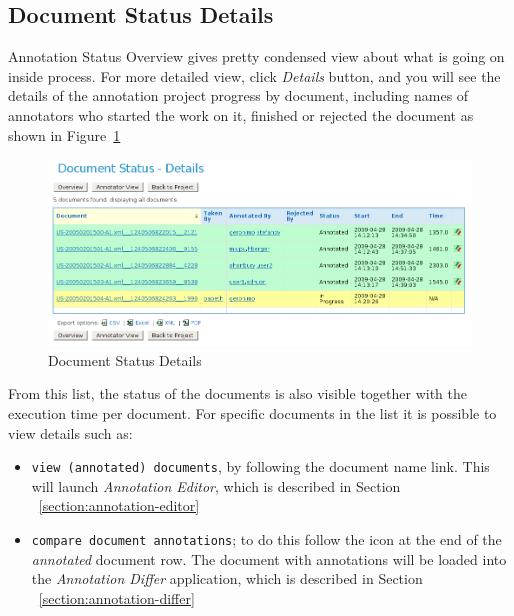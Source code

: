 \subsection{Document Status Details}
Annotation Status Overview gives pretty condensed view about what is going on
inside process.
For more detailed view, click \emph{Details} button, and you will see the
details of the annotation project progress by document, including names of
annotators who started the work on it, finished or
 rejected the document as shown in Figure~\ref{fig:annotationstatusdetailedview}
\begin{figure}[htb]
\centering
\includegraphics[scale=0.4]{annotationstatusdetailedview}
\caption{Document Status Details}
\label{fig:annotationstatusdetailedview}
\end{figure} 
 
 From this list, the status of the documents is also
 visible together with the execution time per document. For specific documents in
 the list it is possible to view details such as:
 \begin{itemize}
   \item \texttt{view (annotated) documents}, by following the document
name link. This will launch \emph{Annotation Editor}, which is described in
Section ~\ref{section:annotation-editor}
   \item \texttt{compare document annotations}; to do this follow the icon
at the end of the \emph{annotated} document row. The document with
   annotations will be loaded into the \emph{Annotation Differ} application,
which is described in Section ~\ref{section:annotation-differ}
\end{itemize}
 
